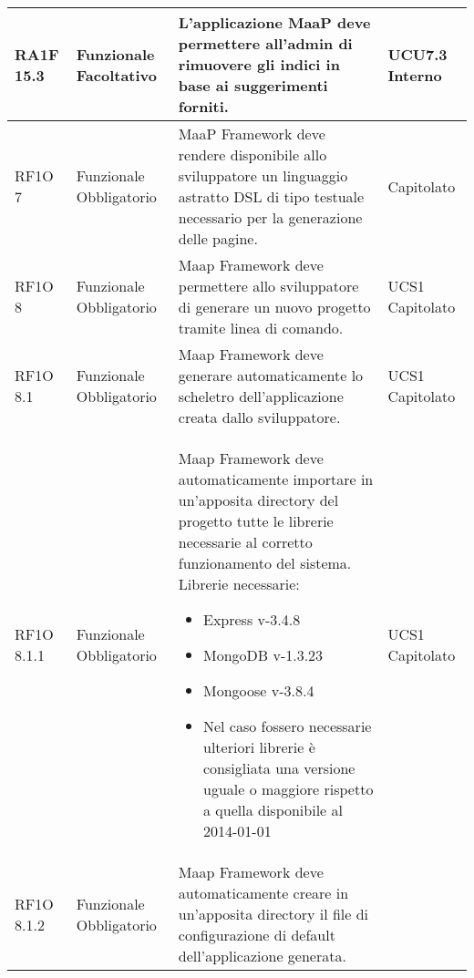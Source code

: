 \begin{center}
\begin{longtable}{ | l | p{2cm} | p{5cm} | p{1.7cm} |}
        RA1F 15.3 & Funzionale \newline  Facoltativo  & L'applicazione MaaP deve permettere all'admin di rimuovere gli indici in base ai suggerimenti forniti. &  UCU7.3 \newline  Interno \newline  \\ \hline      
        RF1O 7 & Funzionale \newline  Obbligatorio  & MaaP Framework deve rendere disponibile allo sviluppatore un linguaggio astratto DSL di tipo testuale necessario per la generazione delle pagine. &  Capitolato \newline  \\ \hline      
        RF1O 8  & Funzionale \newline  Obbligatorio  & Maap Framework deve permettere allo sviluppatore di generare un nuovo progetto tramite linea di comando.
 &  UCS1 \newline  Capitolato \newline  \\ \hline      
        RF1O 8.1  & Funzionale \newline  Obbligatorio  & Maap Framework deve generare automaticamente lo scheletro dell'applicazione creata dallo sviluppatore.
 &  UCS1 \newline  Capitolato \newline  \\ \hline      
        RF1O 8.1.1  & Funzionale \newline  Obbligatorio  & Maap Framework deve automaticamente importare in un'apposita directory del progetto tutte le librerie necessarie al corretto funzionamento del sistema.
Librerie necessarie:
\begin{itemize}
\item Express v-3.4.8
\item MongoDB v-1.3.23
\item Mongoose v-3.8.4
\item Nel caso fossero necessarie ulteriori librerie è consigliata una versione uguale o maggiore rispetto a quella disponibile al 2014-01-01
\end{itemize}
 &  UCS1 \newline  Capitolato \newline  \\ \hline      
        RF1O 8.1.2 & Funzionale \newline  Obbligatorio  & Maap Framework deve automaticamente creare in un'apposita directory il file di configurazione di default dell'applicazione generata.

\end{longtable}
\end{center}
